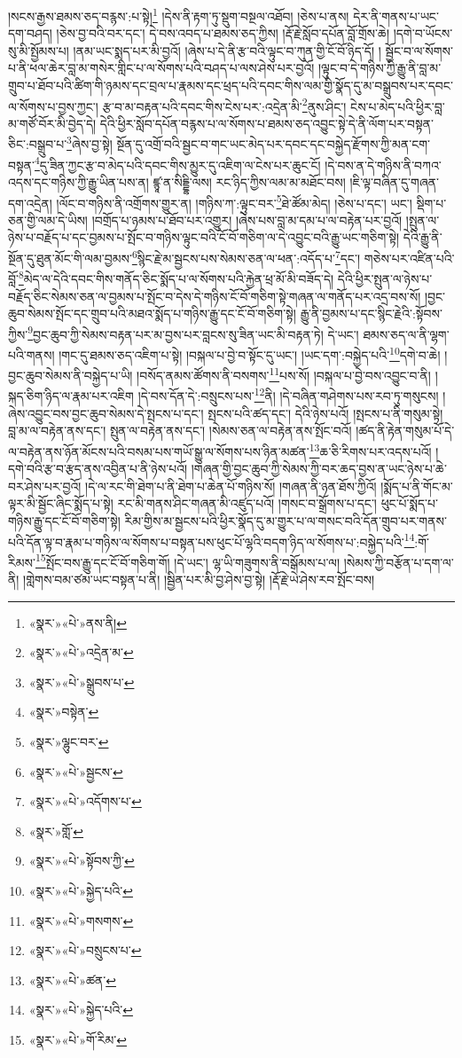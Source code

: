 །སངས་རྒྱས་ཐམས་ཅད་བརྙས་:པ་སྟེ།\footnote{«སྣར་»«པེ་»ནས་ནི།} །དེས་ནི་རྟག་ཏུ་སྡུག་བསྔལ་འཐོབ། །ཅེས་པ་ནས། དེར་ནི་གནས་པ་ཡང་དག་བཤད། །ཅེས་བྱ་བའི་བར་དང་། དེ་བས་འབད་པ་ཐམས་ཅད་ཀྱིས། །རྡོ་རྗེ་སློབ་དཔོན་བློ་གྲོས་ཆེ། །དགེ་བ་ཡོངས་སུ་མི་སྤྱོམས་པ། །ནམ་ཡང་སྨད་པར་མི་བྱའོ། །ཞེས་པ་དེ་ནི་རྩ་བའི་ལྟུང་བ་ཀུན་གྱི་ངོ་བོ་ཉིད་དོ། །
སྦྱོང་བ་ལ་སོགས་པ་ནི་ཕལ་ཆེར་བླ་མ་གསེར་གླིང་པ་ལ་སོགས་པའི་བཤད་པ་ལས་ཤེས་པར་བྱའོ། །ལྟུང་བ་དེ་གཉིས་ཀྱི་རྒྱུ་ནི་བླ་མ་གྲུབ་པ་ཐོབ་པའི་ཚིག་གི་ཉམས་དང་བྲལ་པ་རྣམས་དང་ཕྲད་པའི་དབང་གིས་ལམ་གྱི་སྣོད་དུ་མ་བསྒྲུབས་པར་དབང་ལ་སོགས་པ་བྱས་ཀྱང་། རྩ་བ་མ་བརྟན་པའི་དབང་གིས་ངེས་པར་:འདྲེན་མི་\footnote{«སྣར་»«པེ་»འདྲེན་མ་}ནུས་ཤིང་། ངེས་པ་མེད་པའི་ཕྱིར་བླ་མ་གཙོ་བོར་མི་བྱེད་དེ། དེའི་ཕྱིར་སློབ་དཔོན་བརྙས་པ་ལ་སོགས་པ་ཐམས་ཅད་འབྱུང་སྟེ་དེ་ནི་ལོག་པར་བསྟན་ཅིང་:བསྒྲུབ་པ་\footnote{«སྣར་»«པེ་»སྒྲུབས་པ་}ཞེས་བྱ་སྟེ། སྔོན་དུ་འགྲོ་བའི་སྦྱང་བ་གང་ཡང་མེད་པར་དབང་དང་བསྐྱེད་རྫོགས་ཀྱི་མན་ངག་བསྟན་\footnote{«སྣར་»བསྟེན་}དུ་ཟིན་ཀྱང་རྩ་བ་མེད་པའི་དབང་གིས་མྱུར་དུ་འཇིག་ལ་ངེས་པར་ཆུང་ངོ། །དེ་བས་ན་དེ་གཉིས་ནི་བཀའ་འདས་དང་གཉིས་ཀྱི་རྒྱུ་ཡིན་པས་ན། ཛྙཱ་ན་སིདྡྷི་ལས། རང་ཉིད་ཀྱིས་ལམ་མ་མཐོང་བས། །ཇི་ལྟ་བཞིན་དུ་གཞན་དག་འདྲེན། །ལོང་བ་གཉིས་ནི་འགྲོགས་གྱུར་ན། །གཉིས་ཀ་:ལྟུང་བར་\footnote{«སྣར་»ལྷུང་བར་}ཐེ་ཚོམ་མེད། །ཅེས་པ་དང་། ཡང་། སྡིག་པ་ཅན་གྱི་ལམ་དེ་ཡིས། །བགྲོད་པ་ཉམས་པ་ཐོབ་པར་འགྱུར། །ཞེས་པས་བླ་མ་དམ་པ་ལ་བརྟེན་པར་བྱའོ། །སྤུན་ལ་ཉེས་པ་བརྗོད་པ་དང་བྱམས་པ་སྤོང་བ་གཉིས་ལྟུང་བའི་ངོ་བོ་གཅིག་ལ་དེ་འབྱུང་བའི་རྒྱུ་ཡང་གཅིག་སྟེ། དེའི་རྒྱུ་ནི་སྔོན་དུ་ཐུན་མོང་གི་ལམ་བྱམས་\footnote{«སྣར་»«པེ་»སྦྱངས་}སྙིང་རྗེ་མ་སྦྱངས་པས་སེམས་ཅན་ལ་ཕན་:འདོད་པ་\footnote{«སྣར་»«པེ་»འདོགས་པ་}དང་། གཅེས་པར་འཛིན་པའི་བློ་\footnote{«སྣར་»གློ་}མེད་ལ་དེའི་དབང་གིས་གནོད་ཅིང་སྨོད་པ་ལ་སོགས་པའི་རྐྱེན་ཕྲ་མོ་མི་བཟོད་དེ། དེའི་ཕྱིར་སྤུན་ལ་ཉེས་པ་བརྗོད་ཅིང་སེམས་ཅན་ལ་བྱམས་པ་སྤོང་བ་དེས་དེ་གཉིས་ངོ་བོ་གཅིག་སྟེ་གཞན་ལ་གནོད་པར་འདྲ་བས་སོ། །བྱང་ཆུབ་སེམས་སྤོང་དང་གྲུབ་པའི་མཐའ་སྨོད་པ་གཉིས་རྒྱུ་དང་ངོ་བོ་གཅིག་སྟེ། རྒྱུ་ནི་བྱམས་པ་དང་སྙིང་རྗེའི་:སྟོབས་ཀྱིས་\footnote{«སྣར་»«པེ་»སྟོབས་ཀྱི་}བྱང་ཆུབ་ཀྱི་སེམས་བརྟན་པར་མ་བྱས་པར་བླངས་སུ་ཟིན་ཡང་མི་བརྟན་ཏེ། དེ་ཡང་། ཐམས་ཅད་ལ་ནི་ལྷག་པའི་གནས། །གང་དུ་ཐམས་ཅད་འཇིག་པ་སྟེ། །བསྐལ་པ་བྱེ་བ་སྟོང་དུ་ཡང་། །ཡང་དག་:བསྐྱེད་པའི་\footnote{«སྣར་»«པེ་»སྐྱེད་པའི་}དགེ་བ་ཆེ། །བྱང་ཆུབ་སེམས་ནི་བསྐྱེད་པ་ཡི། །བསོད་ནམས་ཚོགས་ནི་བསགས་\footnote{«སྣར་»«པེ་»གསགས་}པས་སོ། །བསྐལ་པ་བྱེ་བས་འབྱུང་བ་ནི། །སྐད་ཅིག་ཉིད་ལ་རྣམ་པར་འཇིག །དེ་བས་དོན་དེ་:བསྲུངས་པས་\footnote{«སྣར་»«པེ་»བསྲུངས་པ་}ནི། །དེ་བཞིན་གཤེགས་པས་རབ་ཏུ་གསུངས། །ཞེས་འབྱུང་བས་བྱང་ཆུབ་སེམས་དེ་སྤངས་པ་དང་། སྤངས་པའི་ཚད་དང་། དེའི་ཉེས་པའོ། །སྤངས་པ་ནི་གསུམ་སྟེ། བླ་མ་ལ་བརྟེན་ནས་དང་། སྤུན་ལ་བརྟེན་ནས་དང་། །སེམས་ཅན་ལ་བརྟེན་ནས་སྤོང་བའོ། །ཚད་ནི་རྟེན་གསུམ་པོ་དེ་ལ་བརྟེན་ནས་ཉོན་མོངས་པའི་བསམ་པས་གཡོ་སྒྱུ་ལ་སོགས་པས་ཉིན་མཚན་\footnote{«སྣར་»«པེ་»ཚན་}ཆ་ཅི་རིགས་པར་འདས་པའོ། །དགེ་བའི་རྩ་བ་རྩད་ནས་འབྱིན་པ་ནི་ཉེས་པའོ། །གཞན་གྱི་བྱང་ཆུབ་ཀྱི་སེམས་ཀྱི་བར་ཆད་བྱས་ན་ཡང་ཉེས་པ་ཆེ་བར་ཤེས་པར་བྱའོ། །དེ་ལ་རང་གི་ཐེག་པ་ནི་ཐེག་པ་ཆེན་པོ་གཉིས་སོ། །གཞན་ནི་ཉན་ཐོས་ཀྱིའོ། །སྨོད་པ་ནི་གོང་མ་ལྟར་མི་སྦྱོང་ཞིང་སྨོད་པ་སྟེ། རང་མི་གནས་ཤིང་གཞན་མི་འཛུད་པའོ། །གསང་བ་སྒྲོགས་པ་དང་། ཕུང་པོ་སྨོད་པ་གཉིས་རྒྱུ་དང་ངོ་བོ་གཅིག་སྟེ། རིམ་གྱིས་མ་སྦྱངས་པའི་ཕྱིར་སྣོད་དུ་མ་གྱུར་པ་ལ་གསང་བའི་དོན་གྲུབ་པར་གནས་པའི་དོན་ལྟ་བ་རྣམ་པ་གཉིས་ལ་སོགས་པ་བསྟན་པས་ཕུང་པོ་ལྷའི་བདག་ཉིད་ལ་སོགས་པ་:བསྐྱེད་པའི་\footnote{«སྣར་»«པེ་»སྐྱེད་པའི་}:གོ་རིམས་\footnote{«སྣར་»«པེ་»གོ་རིམ་}སྤོང་བས་རྒྱུ་དང་ངོ་བོ་གཅིག་གོ། །དེ་ཡང་། ལྷ་ཡི་གཟུགས་ནི་བསྒོམས་པ་ལ། །སེམས་ཀྱི་བརྩོན་པ་དག་ལ་ནི། །གླེགས་བམ་ཙམ་ཡང་བསྟན་པ་ནི། །སྦྱིན་པར་མི་བྱ་ཤེས་བྱ་སྟེ། །རྡོ་རྗེ་ཡེ་ཤེས་རབ་སྤོང་བས། 